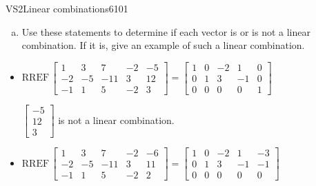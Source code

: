 \begin{exercise}{VS2}{Linear combinations}{6101}
\begin{exerciseStatement}
\begin{enumerate}[(a)]
\begin{itemize}
 
\end{itemize}

     
\item  

 Use these statements to determine if each vector is or is not a linear combination. If it is, give an example of such a linear combination. 

 
\end{enumerate}

     \end{exerciseStatement}
 \begin{exerciseAnswer} 

\begin{itemize}
\item  

 \(
\mathrm{RREF}\, \left[\begin{array}{cccc|c}
1 & 3 & 7 & -2 & -5 \\
-2 & -5 & -11 & 3 & 12 \\
-1 & 1 & 5 & -2 & 3
\end{array}\right] = \left[\begin{array}{cccc|c}
1 & 0 & -2 & 1 & 0 \\
0 & 1 & 3 & -1 & 0 \\
0 & 0 & 0 & 0 & 1
\end{array}\right]
                        \) 

 

 \(\left[\begin{array}{c}
-5 \\
12 \\
3
\end{array}\right]\) is not a linear combination. 

 
\item  

 \(
\mathrm{RREF}\, \left[\begin{array}{cccc|c}
1 & 3 & 7 & -2 & -6 \\
-2 & -5 & -11 & 3 & 11 \\
-1 & 1 & 5 & -2 & 2
\end{array}\right] = \left[\begin{array}{cccc|c}
1 & 0 & -2 & 1 & -3 \\
0 & 1 & 3 & -1 & -1 \\
0 & 0 & 0 & 0 & 0
\end{array}\right]
                        \) 

 


\end{itemize}
\end{exerciseAnswer}
\end{exercise}
